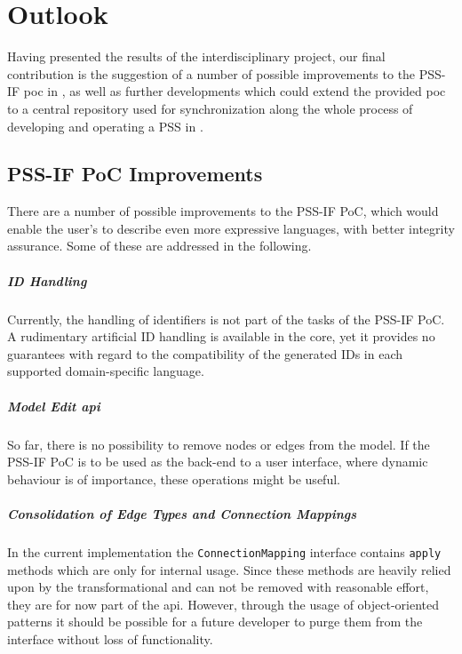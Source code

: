 \chapter{Outlook}
\label{chap:outlook}

Having presented the results of the interdisciplinary project, our final contribution is the suggestion of a number of possible improvements to the PSS-IF \gls{poc} in , as well as further developments which could extend the provided \gls{poc} to a central repository used for synchronization along the whole process of developing and operating a \gls{PSS} in .

\section{PSS-IF PoC Improvements}
\label{sec:outlook:improvements}

There are a number of possible improvements to the PSS-IF PoC, which would enable the user's to describe even more expressive languages, with better integrity assurance. Some of these are addressed in the following.

\paragraph{ID Handling}

Currently, the handling of identifiers is not part of the tasks of the PSS-IF PoC. A rudimentary artificial ID handling is available in the core, yet it provides no guarantees with regard to the compatibility of the generated IDs in each supported domain-specific language.

\paragraph{Model Edit \gls{api}}

So far, there is no possibility to remove nodes or edges from the model. If the PSS-IF PoC is to be used as the back-end to a user interface, where dynamic behaviour is of importance, these operations might be useful.

\paragraph{Consolidation of Edge Types and Connection Mappings}

In the current implementation the \texttt{ConnectionMapping} interface contains \texttt{apply} methods which are only for internal usage. Since these methods are heavily relied upon by the transformational and can not be removed with reasonable effort, they are for now part of the \gls{api}. However, through the usage of object-oriented patterns it should be possible for a future developer to purge them from the interface without loss of functionality.

